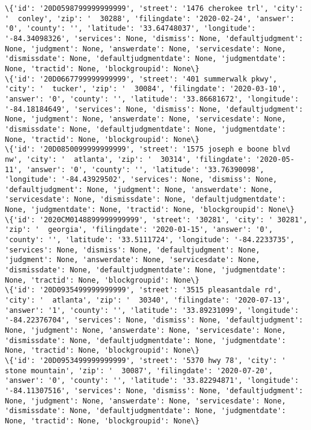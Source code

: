 \documentclass[11pt]{article}
\begin{document}
\begin{Verbatim}[commandchars=\\\{\}]
\{'id': '20D0598799999999999', 'street': '1476 cherokee trl', 'city': '  conley', 'zip': '  30288', 'filingdate': '2020-02-24', 'answer': '0', 'county': '', 'latitude': '33.64748037', 'longitude': '-84.34098326', 'services': None, 'dismiss': None, 'defaultjudgment': None, 'judgment': None, 'answerdate': None, 'servicesdate': None, 'dismissdate': None, 'defaultjudgmentdate': None, 'judgmentdate': None, 'tractid': None, 'blockgroupid': None\}
\{'id': '20D0667799999999999', 'street': '401 summerwalk pkwy', 'city': '  tucker', 'zip': '  30084', 'filingdate': '2020-03-10', 'answer': '0', 'county': '', 'latitude': '33.86681672', 'longitude': '-84.18184649', 'services': None, 'dismiss': None, 'defaultjudgment': None, 'judgment': None, 'answerdate': None, 'servicesdate': None, 'dismissdate': None, 'defaultjudgmentdate': None, 'judgmentdate': None, 'tractid': None, 'blockgroupid': None\}
\{'id': '20D0850099999999999', 'street': '1575 joseph e boone blvd nw', 'city': '  atlanta', 'zip': '  30314', 'filingdate': '2020-05-11', 'answer': '0', 'county': '', 'latitude': '33.76390098', 'longitude': '-84.43929502', 'services': None, 'dismiss': None, 'defaultjudgment': None, 'judgment': None, 'answerdate': None, 'servicesdate': None, 'dismissdate': None, 'defaultjudgmentdate': None, 'judgmentdate': None, 'tractid': None, 'blockgroupid': None\}
\{'id': '2020CM0148899999999999', 'street': '30281', 'city': ' 30281', 'zip': '  georgia', 'filingdate': '2020-01-15', 'answer': '0', 'county': '', 'latitude': '33.5111724', 'longitude': '-84.2233735', 'services': None, 'dismiss': None, 'defaultjudgment': None, 'judgment': None, 'answerdate': None, 'servicesdate': None, 'dismissdate': None, 'defaultjudgmentdate': None, 'judgmentdate': None, 'tractid': None, 'blockgroupid': None\}
\{'id': '20D0935499999999999', 'street': '3515 pleasantdale rd', 'city': '  atlanta', 'zip': '  30340', 'filingdate': '2020-07-13', 'answer': '1', 'county': '', 'latitude': '33.89231099', 'longitude': '-84.22376704', 'services': None, 'dismiss': None, 'defaultjudgment': None, 'judgment': None, 'answerdate': None, 'servicesdate': None, 'dismissdate': None, 'defaultjudgmentdate': None, 'judgmentdate': None, 'tractid': None, 'blockgroupid': None\}
\{'id': '20D0953499999999999', 'street': '5370 hwy 78', 'city': '  stone mountain', 'zip': '  30087', 'filingdate': '2020-07-20', 'answer': '0', 'county': '', 'latitude': '33.82294871', 'longitude': '-84.11307516', 'services': None, 'dismiss': None, 'defaultjudgment': None, 'judgment': None, 'answerdate': None, 'servicesdate': None, 'dismissdate': None, 'defaultjudgmentdate': None, 'judgmentdate': None, 'tractid': None, 'blockgroupid': None\}

\end{Verbatim}
\end{document}
